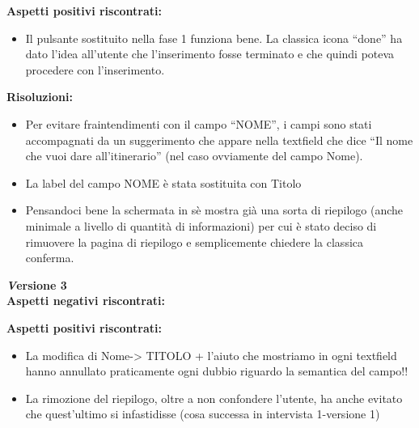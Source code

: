 \textbf{Aspetti positivi riscontrati:}
\begin{itemize}[label=-]

\item Il pulsante sostituito nella fase 1 funziona bene. La classica icona “done” ha
dato l’idea all’utente che l’inserimento fosse terminato e che quindi poteva
procedere con l’inserimento.

\end{itemize}

\textbf{Risoluzioni:}
\begin{itemize}[label=-]
\item Per evitare fraintendimenti con il campo “NOME”, i campi sono stati accompagnati da
un suggerimento che appare nella textfield che dice “Il nome che vuoi dare
all’itinerario” (nel caso ovviamente del campo Nome).
\item La label del campo NOME è stata sostituita con Titolo
\item Pensandoci bene la schermata in sè mostra già una sorta di riepilogo (anche
minimale a livello di quantità di informazioni) per cui è stato deciso di rimuovere la
pagina di riepilogo e semplicemente chiedere la classica conferma.

\end{itemize}

\textbf{\emph Versione 3}\\
\textbf{Aspetti negativi riscontrati:}
\newline\newline

\textbf{Aspetti positivi riscontrati:}
\begin{itemize}[label=-]

\item La modifica di Nome-> TITOLO + l’aiuto che mostriamo in ogni textfield hanno
annullato praticamente ogni dubbio riguardo la semantica del campo!!
\item La rimozione del riepilogo, oltre a non confondere l’utente, ha anche evitato
che quest’ultimo si infastidisse (cosa successa in intervista 1-versione 1)

\end{itemize}

